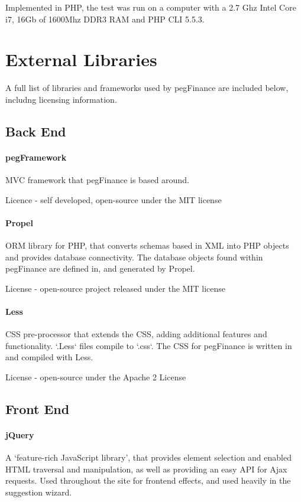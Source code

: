 \begin{appendices}
Implemented in PHP, the test was run on a computer with a 2.7 Ghz Intel Core i7, 16Gb of 1600Mhz DDR3 RAM and PHP CLI 5.5.3.



\chapter{External Libraries} \label{app:externallibraries}

A full list of libraries and frameworks used by pegFinance are included below, includng licensing information.

\section{Back End}
\subsubsection{pegFramework}
MVC framework that pegFinance is based around. 

Licence - self developed, open-source under the MIT license

\subsubsection{Propel}
ORM library for PHP, that converts schemas based in XML into PHP objects and provides database connectivity.
%
The database objects found within pegFinance are defined in, and generated by Propel. 

License - open-source project released under the MIT license

\subsubsection{Less}
CSS pre-processor that extends the CSS, adding additional features and functionality. `.Less` files compile to `.css`.
%
The CSS for pegFinance is written in and compiled with Less.

License - open-source under the Apache 2 License

\section{Front End}
\subsubsection{jQuery}
A `feature-rich JavaScript library', that provides element selection and enabled HTML traversal and manipulation, as well as providing an easy API for Ajax requests.
%
Used throughout the site for frontend effects, and used heavily in the suggestion wizard.


\end{appendices}
